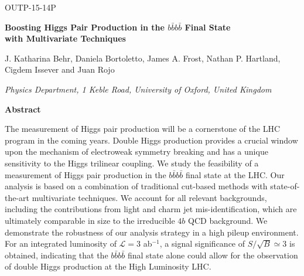 \documentclass[a4paper,11pt]{article}
\begin{document}
\vspace{-2.0cm}
\begin{flushright}
OUTP-15-14P
\end{flushright}

\begin{center}
  {\Large \bf Boosting Higgs Pair Production in the $b\bar{b}b\bar{b}$ Final State\\[0.2cm]
    with
  Multivariate Techniques}
\vspace{.7cm}

J. Katharina Behr, Daniela Bortoletto, James A. Frost,
  Nathan P. Hartland, \\Cigdem Issever and Juan Rojo


\vspace{.3cm}
{\it Physics Department, 1 Keble Road, University of Oxford, United Kingdom }



\vspace{1cm}

{\bf \large Abstract}\\
\end{center}
\vspace{0.1cm}
The measurement of Higgs pair production will be a cornerstone of
  the LHC program in the coming years.
  Double Higgs production provides a crucial window upon the mechanism of electroweak
  symmetry breaking and has a unique sensitivity
  to the Higgs trilinear coupling.
  We study the feasibility of a measurement of
  Higgs pair production in the
  $b\bar{b}b\bar{b}$ final state at the LHC.
  Our analysis is based on a combination of traditional cut-based
  methods with state-of-the-art
  multivariate techniques.
  We account for all relevant
  backgrounds, including the contributions from light and charm
  jet mis-identification, which are ultimately comparable in size 
  to the irreducible $4b$ QCD background.
  We demonstrate the robustness of our analysis strategy in
  a high pileup environment.
  For an integrated luminosity of $\mathcal{L}=3$ ab$^{-1}$,
  a signal significance of  $S/\sqrt{B}\simeq 3$ is obtained,
  indicating
  that the $b\bar{b}b\bar{b}$ final state
alone could allow for the observation of double Higgs production
at the High Luminosity LHC.

\clearpage








\end{document}
